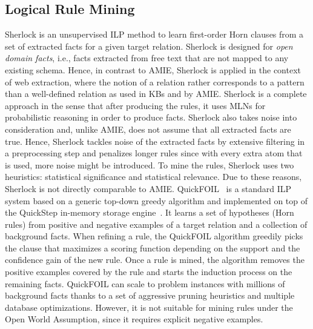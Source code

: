 \subsection{Logical Rule Mining}
Sherlock \cite{SchEtzWel10} is an unsupervised ILP method to learn first-order Horn clauses from a set of extracted facts 
for a given target relation. 
Sherlock is designed for \emph{open domain facts}, i.e., facts extracted from free text that are not mapped to any existing schema.
Hence, in contrast to AMIE, Sherlock is applied in the context of web extraction, where the notion of a relation rather corresponds to a pattern than a well-defined relation as used in KBs and by AMIE.
Sherlock is a complete approach in the sense that after producing the rules, it uses MLNs for probabilistic reasoning in order to produce facts.
Sherlock also takes noise into consideration and, unlike AMIE, does not assume that all extracted facts are true. 
Hence, Sherlock tackles noise of the extracted facts by extensive filtering in a preprocessing step and penalizes longer rules since with every extra atom that is used, more noise might be introduced. 
To mine the rules, Sherlock uses two heuristics: statistical significance and statistical relevance. %
Due to these reasons, Sherlock is not directly comparable to AMIE. 
% 
QuickFOIL~\cite{quickfoil} is a standard ILP system based on a generic top-down greedy algorithm and implemented 
on top of  the QuickStep in-memory storage engine~\cite{Chasseur:2013:DES:2536258.2536260}. It learns a set of hypotheses (Horn rules)
from positive and negative examples of a target relation and a collection of background facts. When refining a rule, the QuickFOIL algorithm 
greedily picks the clause that maximizes a scoring 
function depending on the support and the confidence gain of the new rule. Once a rule is mined, the algorithm removes the positive examples
covered by the rule and starts the induction process on the remaining facts.
QuickFOIL can scale to problem  instances with millions of background facts thanks to a 
set of aggressive pruning heuristics and multiple database optimizations. 
However, it is not suitable for mining rules under the Open World Assumption, since it requires explicit negative examples. 
